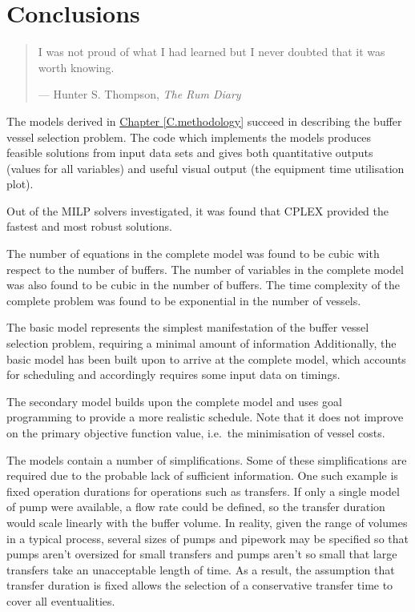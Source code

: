 %
%
%
%

\chapter{Conclusions}\label{C.conclusions}

\begin{quote}
I was not proud of what I had learned but I never doubted that it was worth
knowing.

\hspace{2cm}--- Hunter S. Thompson, \emph{The Rum Diary}
\end{quote}

The models derived in \hyperref[C.methodology]{Chapter \ref*{C.methodology}}
succeed in describing the buffer vessel selection problem.
The code which implements the models produces feasible
solutions from input data sets and gives both quantitative outputs (values for
all variables) and useful visual output (the equipment time utilisation plot).

Out of the MILP solvers investigated, it was found that CPLEX provided the
fastest and most robust solutions.

The number of equations in the complete model was found to be cubic with
respect to the number of buffers.  The number of variables in the complete
model was also found to be cubic in the number of buffers.
The time complexity of the complete problem was found to be exponential in
the number of vessels.

The basic model represents the simplest manifestation of the buffer vessel
selection problem, requiring a minimal amount of information
Additionally, the basic model has been built upon to arrive at the complete
model, which accounts for scheduling and accordingly requires some input data
on timings.

The secondary model builds upon the complete model and uses goal programming to
provide a more realistic schedule. Note that it does not improve on the primary
objective function value, i.e.\ the minimisation of vessel costs.

The models contain a number of simplifications.
Some of these simplifications are required due to the probable lack of
sufficient information.
One such example is fixed operation durations for operations such as
transfers.
If only a single model of pump were available, a flow rate could be
defined, so the transfer duration would scale linearly with the buffer volume.
In reality, given the range of volumes in a typical process, several sizes of
pumps and pipework may be specified so that pumps aren't oversized for small
transfers and pumps aren't so small that large transfers take an unacceptable
length of time.  As a result, the assumption that transfer duration is fixed
allows the selection of a conservative transfer time to cover all
eventualities.

